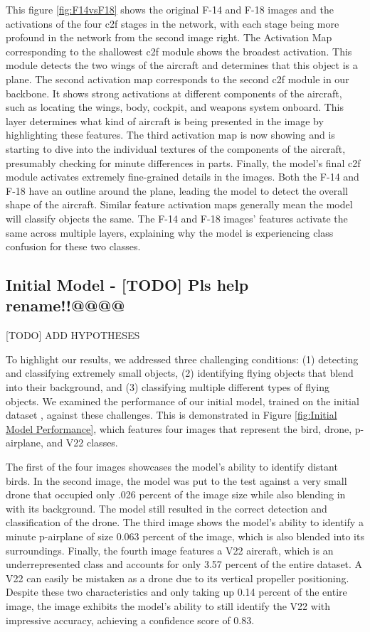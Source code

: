 \documentclass[10pt,twocolumn,letterpaper]{article}
\begin{document}
This figure \ref{fig:F14vsF18} shows the original F-14 and F-18 images and the activations of the four c2f stages in the network, with each stage being more profound in the network from the second image right. The Activation Map corresponding to the shallowest c2f module shows the broadest activation. This module detects the two wings of the aircraft and determines that this object is a plane. The second activation map corresponds to the second c2f module in our backbone. It shows strong activations at different components of the aircraft, such as locating the wings, body, cockpit, and weapons system onboard. This layer determines what kind of aircraft is being presented in the image by highlighting these features. The third activation map is now showing and is starting to dive into the individual textures of the components of the aircraft, presumably checking for minute differences in parts. Finally, the model's final c2f module activates extremely fine-grained details in the images. Both the F-14 and F-18 have an outline around the plane, leading the model to detect the overall shape of the aircraft. Similar feature activation maps generally mean the model will classify objects the same. The F-14 and F-18 images' features activate the same across multiple layers, explaining why the model is experiencing class confusion for these two classes.

\subsection{Initial Model  -  [TODO] Pls help rename!!@@@@}

[TODO] ADD HYPOTHESES

To highlight our results, we addressed three challenging conditions: (1) detecting and classifying extremely small objects, (2) identifying flying objects that blend into their background, and (3) classifying multiple different types of flying objects. We examined the performance of our initial model, trained on the initial dataset \cite{InitialDataset}, against these challenges. This is demonstrated in Figure \ref{fig:Initial Model Performance}, which features four images that represent the bird, drone, p-airplane, and V22 classes.

The first of the four images showcases the model's ability to identify distant birds. In the second image, the model was put to the test against a very small drone that occupied only .026 percent of the image size while also blending in with its background. The model still resulted in the correct detection and classification of the drone. The third image shows the model's ability to identify a minute p-airplane of size 0.063 percent of the image, which is also blended into its surroundings. Finally, the fourth image features a V22 aircraft, which is an underrepresented class and accounts for only 3.57 percent of the entire dataset. A V22 can easily be mistaken as a drone due to its vertical propeller positioning. Despite these two characteristics and only taking up 0.14 percent of the entire image, the image exhibits the model's ability to still identify the V22 with impressive accuracy, achieving a confidence score of 0.83.
\end{document}
